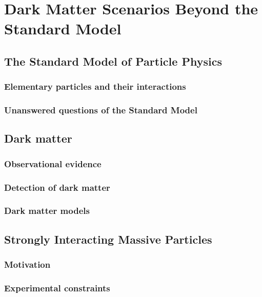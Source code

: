 \graphicspath{{chapt_dutch/}{intro/}{theory/}}

\renewcommand\evenpagerightmark{{\scshape\small The CMS Detector}}
\renewcommand\oddpageleftmark{{\scshape\small Chapter 2}}


\hyphenation{}

\chapter{Dark Matter Scenarios Beyond the Standard Model}
\label{ch2}

\section{The Standard Model of Particle Physics}

\subsection{Elementary particles and their interactions}

\subsection{Unanswered questions of the Standard Model}
\section{Dark matter}

\subsection{Observational evidence}

\subsection{Detection of dark matter}

\subsection{Dark matter models}


\section{Strongly Interacting Massive Particles}

\subsection{Motivation}

\subsection{Experimental constraints}

\clearpage{\pagestyle{empty}\cleardoublepage}
